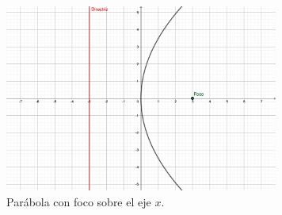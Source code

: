 \documentclass[letterpaper]{article}
\renewcommand{\*}{\cdot}
\theoremstyle{definition}
\begin{document}
	\begin{figure}[h!]
		\centering
		\includegraphics[width=9cm]{Parabola}
		\caption{Parábola con foco sobre el eje $x$.}
		\label{F1}
	\end{figure}
	
\end{document}
